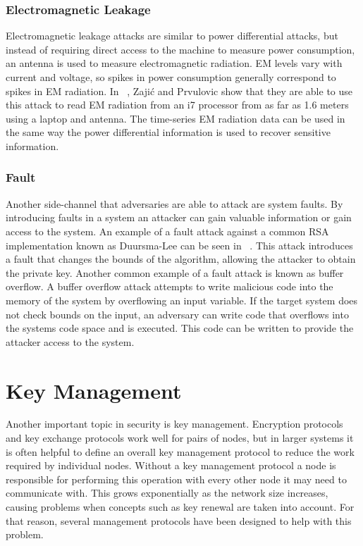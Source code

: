 \documentclass[journal]{IEEEtran}
\begin{document}
\subsubsection{Electromagnetic Leakage}
Electromagnetic leakage attacks are similar to power differential attacks, but instead of requiring direct access to the machine to measure power consumption, an antenna is used to measure electromagnetic radiation. EM levels vary with current and voltage, so spikes in power consumption generally correspond to spikes in EM radiation. In ~\cite{SC5}, Zajić and Prvulovic show that they are able to use this attack to read EM radiation from an i7 processor from as far as 1.6 meters using a laptop and antenna. The time-series EM radiation data can be used in the same way the power differential information is used to recover sensitive information.
\subsubsection{Fault}
Another side-channel that adversaries are able to attack are system faults. By introducing faults in a system an attacker can gain valuable information or gain access to the system. An example of a fault attack against a common RSA implementation known as Duursma-Lee can be seen in ~\cite{SC6}. This attack introduces a fault that changes the bounds of the algorithm, allowing the attacker to obtain the private key. Another common example of a fault attack is known as buffer overflow. A buffer overflow attack attempts to write malicious code into the memory of the system by overflowing an input variable. If the target system does not check bounds on the input, an adversary can write code that overflows into the systems code space and is executed. This code can be written to provide the attacker access to the system.

\section{Key Management}
Another important topic in security is key management. Encryption protocols and key exchange protocols work well for pairs of nodes, but in larger systems it is often helpful to define an overall key management protocol to reduce the work required by individual nodes. Without a key management protocol a node is responsible for performing this operation with every other node it may need to communicate with. This grows exponentially as the network size increases, causing problems when concepts such as key renewal are taken into account. For that reason, several management protocols have been designed to help with this problem.
\end{document}
